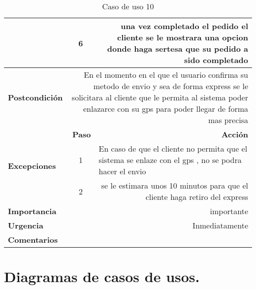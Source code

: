 \documentclass[conference]{IEEEtran}
\begin{document}
\begin{table}[H]
\begin{adjustbox}{width=0.45\textwidth}
\begin{tabular}{|p{11.215em}|r|r|}
\cmidrule{2-3}    \multicolumn{1}{|c|}{} & \multicolumn{1}{c|}{6} & \multicolumn{1}{p{32em}|}{una vez completado el pedido el cliente se le mostrara una opcion donde haga sertesa que su pedido a sido completado } \\
    \midrule
    \textbf{Postcondición} & \multicolumn{2}{p{37.355em}|}{En el momento en el que el usuario confirma su metodo de envio y sea de forma express se le solicitara al cliente que le permita al sistema poder enlazarce con su gps para poder llegar de forma mas precisa} \\
    \midrule
    \multirow{4}[6]{*}{\textbf{Excepciones}} & \multicolumn{1}{p{5.355em}|}{\textbf{Paso}} & \multicolumn{1}{p{32em}|}{\textbf{Acción}} \\
\cmidrule{2-3}    \multicolumn{1}{|c|}{} & \multicolumn{1}{c|}{\multirow{2}[2]{*}{1}} & \multicolumn{1}{l|}{\multirow{2}[2]{*}{En caso de que el cliente no permita que el sistema se enlaze con el gps , no se podra hacer el envio }} \\
    \multicolumn{1}{|c|}{} &       &  \\
\cmidrule{2-3}    \multicolumn{1}{|c|}{} & \multicolumn{1}{c|}{2} & \multicolumn{1}{p{32em}|}{se le estimara unos 10 minutos para que el cliente haga retiro del express } \\
    \midrule
    \textbf{Importancia} & \multicolumn{2}{p{37.355em}|}{importante } \\
    \midrule
    \textbf{Urgencia} & \multicolumn{2}{p{37.355em}|}{Inmediatamente} \\
    \midrule
    \textbf{Comentarios} & \multicolumn{2}{r|}{} \\
    \bottomrule
    \end{tabular}%
    \end{adjustbox}
    \vspace{0.2cm}
    \caption{Caso de uso 10}
  \label{tab:addlabel}%
\end{table}%

\section{Diagramas de casos de usos.}
\end{document}
